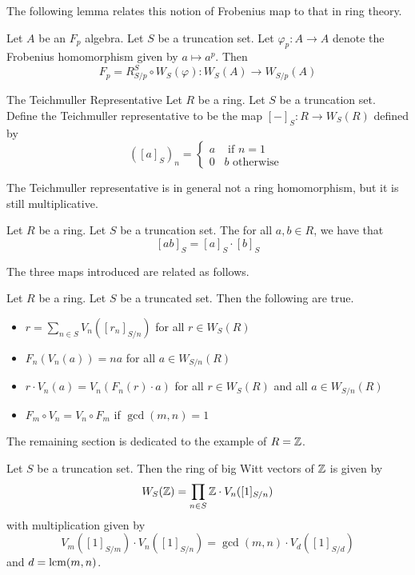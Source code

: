 \documentclass[a4paper]{article}
\begin{document}
The following lemma relates this notion of Frobenius map to that in ring theory. 

\begin{lmm}{}{} Let $A$ be an $F_p$ algebra. Let $S$ be a truncation set. Let $\varphi_p:A\to A$ denote the Frobenius homomorphism given by $a\mapsto a^p$. Then $$F_p=R_{S/p}^S\circ W_S(\varphi):W_S(A)\to W_{S/p}(A)$$
\end{lmm}

\begin{defn}{The Teichmuller Representative}{} Let $R$ be a ring. Let $S$ be a truncation set. Define the Teichmuller representative to be the map $[-]_S:R\to W_S(R)$ defined by $$([a]_S)_n=\begin{cases}
a & \text{ if } n=1\\
0 &b \text{ otherwise }
\end{cases}$$
\end{defn}

The Teichmuller representative is in general not a ring homomorphism, but it is still multiplicative. 

\begin{lmm}{}{} Let $R$ be a ring. Let $S$ be a truncation set. The for all $a,b\in R$, we have that $$[ab]_S=[a]_S\cdot [b]_S$$
\end{lmm}

The three maps introduced are related as follows. 

\begin{prp}{}{} Let $R$ be a ring. Let $S$ be a truncated set. Then the following are true. 
\begin{itemize}
\item $r=\sum_{n\in S}V_n([r_n]_{S/n})$ for all $r\in W_S(R)$
\item $F_n(V_n(a))=na$ for all $a\in W_{S/n}(R)$
\item $r\cdot V_n(a)=V_n(F_n(r)\cdot a)$ for all $r\in W_S(R)$ and all $a\in W_{S/n}(R)$
\item $F_m\circ V_n=V_n\circ F_m$ if $\gcd(m,n)=1$
\end{itemize}
\end{prp}

The remaining section is dedicated to the example of $R=\mathbb{Z}$. 

\begin{prp}{}{} Let $S$ be a truncation set. Then the ring of big Witt vectors of $\mathbb{Z}$ is given by $$W_S(\mathbb{Z})=\prod_{n\in S}\mathbb{Z}\cdot V_n([1]_{S/n})$$ with multiplication given by $$V_m([1]_{S/m})\cdot V_n([1]_{S/n})=\gcd(m,n)\cdot V_d([1]_{S/d})$$ and $d=\operatorname{lcm}(m,n)$. 
\end{prp}
\end{document}
